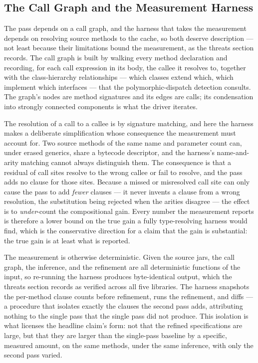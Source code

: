 \subsection{The Call Graph and the Measurement Harness}

The pass depends on a call graph, and the harness that takes the measurement
depends on resolving source methods to the cache, so both deserve description ---
not least because their limitations bound the measurement, as the threats section
records. The call graph is built by walking every method declaration and recording,
for each call expression in its body, the callee it resolves to, together with the
class-hierarchy relationships --- which classes extend which, which implement which
interfaces --- that the polymorphic-dispatch detection consults. The graph's nodes
are method signatures and its edges are calls; its condensation into strongly
connected components is what the driver iterates.

The resolution of a call to a callee is by signature matching, and here the harness
makes a deliberate simplification whose consequence the measurement must account
for. Two source methods of the same name and parameter count can, under erased
generics, share a bytecode descriptor, and the harness's name-and-arity matching
cannot always distinguish them. The consequence is that a residual of call sites
resolve to the wrong callee or fail to resolve, and the pass adds no clause for
those sites. Because a missed or misresolved call site can only cause the pass to
add \emph{fewer} clauses --- it never invents a clause from a wrong resolution, the
substitution being rejected when the arities disagree --- the effect is to
\emph{under}-count the compositional gain. Every number the measurement reports is
therefore a lower bound on the true gain a fully type-resolving harness would find,
which is the conservative direction for a claim that the gain is substantial: the
true gain is at least what is reported.

The measurement is otherwise deterministic. Given the source jars, the call graph,
the inference, and the refinement are all deterministic functions of the input, so
re-running the harness produces byte-identical output, which the threats section
records as verified across all five libraries. The harness snapshots the per-method
clause counts before refinement, runs the refinement, and diffs --- a procedure
that isolates exactly the clauses the second pass adds, attributing nothing to the
single pass that the single pass did not produce. This isolation is what licenses
the headline claim's form: not that the refined specifications are large, but that
they are larger than the single-pass baseline by a specific, measured amount, on
the same methods, under the same inference, with only the second pass varied.

